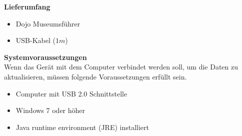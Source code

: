 \textbf{Lieferumfang}

\begin{itemize}
\item Dojo Museumsführer
\end{itemize}
\begin{itemize}
\item USB-Kabel ($1m$)
\end{itemize}
\textbf{Systemvoraussetzungen}
\\[5mm]
Wenn das Gerät mit dem Computer verbindet werden soll, um die Daten zu aktualisieren, müssen folgende Voraussetzungen erfüllt sein.
\begin{itemize}
\item Computer mit USB 2.0 Schnittstelle
\end{itemize}
\begin{itemize}
\item Windows 7 oder höher
\end{itemize}
\begin{itemize}
\item Java runtime environment (JRE) installiert
\end{itemize}